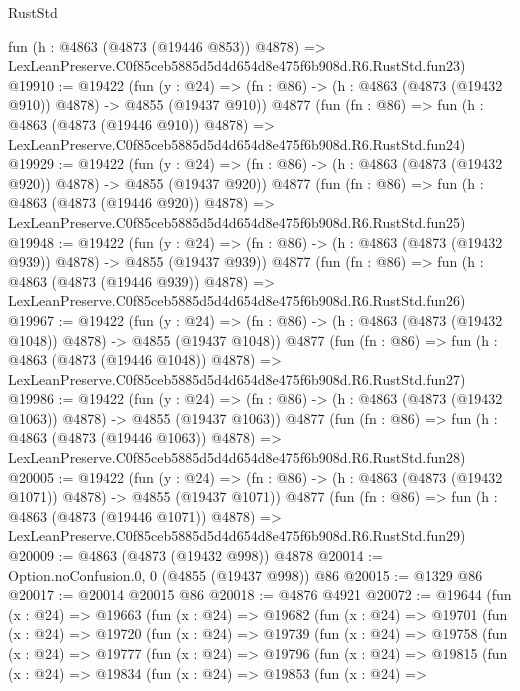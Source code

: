 \begin{lexlean}{RustStd}
\begin{coremodule}
    fun (h : @4863 (@4873 (@19446 @853)) @4878) =>
    LexLeanPreserve.C0f85ceb5885d5d4d654d8e475f6b908d.R6.RustStd.fun23)
@19910 := @19422
    (fun (y : @24) => (fn : @86) -> (h : @4863 (@4873 (@19432 @910)) @4878) -> @4855 (@19437 @910))
    @4877
    (fun (fn : @86) =>
    fun (h : @4863 (@4873 (@19446 @910)) @4878) =>
    LexLeanPreserve.C0f85ceb5885d5d4d654d8e475f6b908d.R6.RustStd.fun24)
@19929 := @19422
    (fun (y : @24) => (fn : @86) -> (h : @4863 (@4873 (@19432 @920)) @4878) -> @4855 (@19437 @920))
    @4877
    (fun (fn : @86) =>
    fun (h : @4863 (@4873 (@19446 @920)) @4878) =>
    LexLeanPreserve.C0f85ceb5885d5d4d654d8e475f6b908d.R6.RustStd.fun25)
@19948 := @19422
    (fun (y : @24) => (fn : @86) -> (h : @4863 (@4873 (@19432 @939)) @4878) -> @4855 (@19437 @939))
    @4877
    (fun (fn : @86) =>
    fun (h : @4863 (@4873 (@19446 @939)) @4878) =>
    LexLeanPreserve.C0f85ceb5885d5d4d654d8e475f6b908d.R6.RustStd.fun26)
@19967 := @19422
    (fun (y : @24) =>
    (fn : @86) -> (h : @4863 (@4873 (@19432 @1048)) @4878) -> @4855 (@19437 @1048))
    @4877
    (fun (fn : @86) =>
    fun (h : @4863 (@4873 (@19446 @1048)) @4878) =>
    LexLeanPreserve.C0f85ceb5885d5d4d654d8e475f6b908d.R6.RustStd.fun27)
@19986 := @19422
    (fun (y : @24) =>
    (fn : @86) -> (h : @4863 (@4873 (@19432 @1063)) @4878) -> @4855 (@19437 @1063))
    @4877
    (fun (fn : @86) =>
    fun (h : @4863 (@4873 (@19446 @1063)) @4878) =>
    LexLeanPreserve.C0f85ceb5885d5d4d654d8e475f6b908d.R6.RustStd.fun28)
@20005 := @19422
    (fun (y : @24) =>
    (fn : @86) -> (h : @4863 (@4873 (@19432 @1071)) @4878) -> @4855 (@19437 @1071))
    @4877
    (fun (fn : @86) =>
    fun (h : @4863 (@4873 (@19446 @1071)) @4878) =>
    LexLeanPreserve.C0f85ceb5885d5d4d654d8e475f6b908d.R6.RustStd.fun29)
@20009 := @4863 (@4873 (@19432 @998)) @4878
@20014 := Option.noConfusion.{0, 0} (@4855 (@19437 @998)) @86
@20015 := @1329 @86
@20017 := @20014 @20015 @86
@20018 := @4876 @4921
@20072 := @19644
    (fun (x : @24) =>
    @19663
      (fun (x : @24) =>
      @19682
        (fun (x : @24) =>
        @19701
          (fun (x : @24) =>
          @19720
            (fun (x : @24) =>
            @19739
              (fun (x : @24) =>
              @19758
                (fun (x : @24) =>
                @19777
                  (fun (x : @24) =>
                  @19796
                    (fun (x : @24) =>
                    @19815
                      (fun (x : @24) =>
                      @19834
                        (fun (x : @24) =>
                        @19853
                          (fun (x : @24) =>

\end{coremodule}
\end{lexlean}
